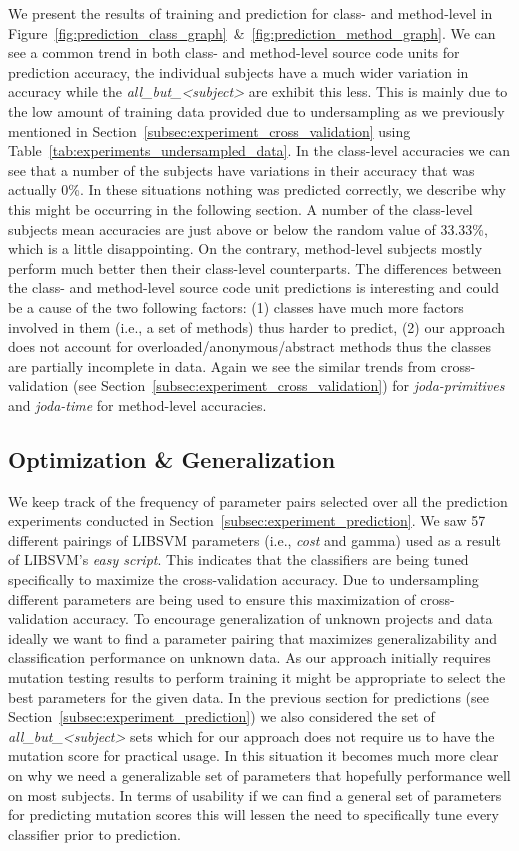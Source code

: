We present the results of training and prediction for class- and method-level in Figure~\ref{fig:prediction_class_graph}~\&~\ref{fig:prediction_method_graph}. We can see a common trend in both class- and method-level source code units for prediction accuracy, the individual subjects have a much wider variation in accuracy while the \emph{all\_but\_<subject>} are exhibit this less. This is mainly due to the low amount of training data provided due to undersampling as we previously mentioned in Section~\ref{subsec:experiment_cross_validation} using Table~\ref{tab:experiments_undersampled_data}. In the class-level accuracies we can see that a number of the subjects have variations in their accuracy that was actually 0\%. In these situations nothing was predicted correctly, we describe why this might be occurring in the following section. A number of the class-level subjects mean accuracies are just above or below the random value of 33.33\%, which is a little disappointing. On the contrary, method-level subjects mostly perform much better then their class-level counterparts. The differences between the class- and method-level source code unit predictions is interesting and could be a cause of the two following factors: (1) classes have much more factors involved in them (i.e., a set of methods) thus harder to predict, (2) our approach does not account for overloaded/anonymous/abstract methods thus the classes are partially incomplete in data. Again we see the similar trends from cross-validation (see Section~\ref{subsec:experiment_cross_validation}) for \emph{joda-primitives} and \emph{joda-time} for method-level accuracies.


\subsection{Optimization \& Generalization}
\label{subsec:experiment_optimization_generalization}
We keep track of the frequency of parameter pairs selected over all the prediction experiments conducted in Section~\ref{subsec:experiment_prediction}. We saw 57 different pairings of LIBSVM parameters (i.e., \emph{cost} and {gamma}) used as a result of LIBSVM's \emph{easy script}. This indicates that the classifiers are being tuned specifically to maximize the cross-validation accuracy. Due to undersampling different parameters are being used to ensure this maximization of cross-validation accuracy. To encourage generalization of unknown projects and data ideally we want to find a parameter pairing that maximizes generalizability and classification performance on unknown data. As our approach initially requires mutation testing results to perform training it might be appropriate to select the best parameters for the given data. In the previous section for predictions (see Section~\ref{subsec:experiment_prediction}) we also considered the set of \emph{all\_but\_<subject>} sets which for our approach does not require us to have the mutation score for practical usage. In this situation it becomes much more clear on why we need a generalizable set of parameters that hopefully performance well on most subjects. In terms of usability if we can find a general set of parameters for predicting mutation scores this will lessen the need to specifically tune every classifier prior to prediction.

